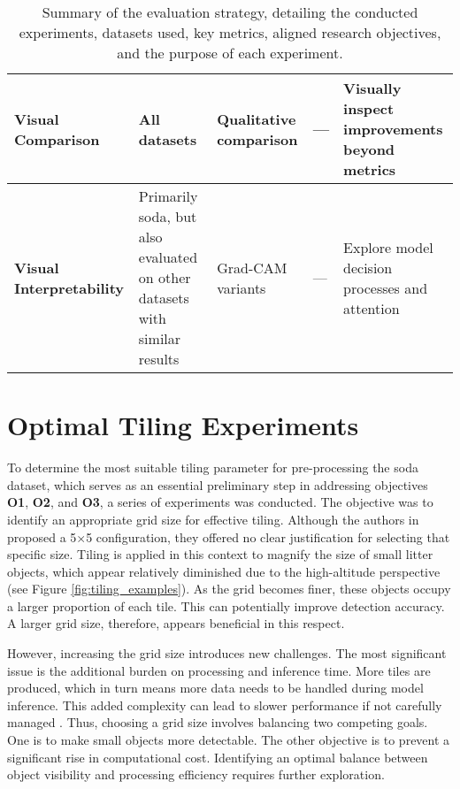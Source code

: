 \begin{table}[htbp]
\begin{adjustbox}{max width=\textwidth}
\begin{tabular}{|l|p{3.5cm}|p{3.5cm}|p{2.5cm}|p{5cm}|}
        \textbf{Visual Comparison} & All datasets & Qualitative comparison & — & Visually inspect improvements beyond metrics \\ \hline
        \textbf{Visual Interpretability} & Primarily \gls{soda}, but also evaluated on other datasets with similar results & Grad-CAM variants & — & Explore model decision processes and attention \\
        \hline
    \end{tabular}
    \end{adjustbox}
    \caption{Summary of the evaluation strategy, detailing the conducted experiments, datasets used, key metrics, aligned research objectives, and the purpose of each experiment.}
    \label{tab:experiment_strategy}
\end{table}


\section{Optimal Tiling Experiments}
\label{sec:5_tiling_exp}

To determine the most suitable tiling parameter for pre-processing the \gls{soda} dataset, which serves as an essential preliminary step in addressing objectives \textbf{O1}, \textbf{O2}, and \textbf{O3}, a series of experiments was conducted. The objective was to identify an appropriate grid size for effective tiling. Although the authors in \cite{detect_litter} proposed a 5$\times$5 configuration, they offered no clear justification for selecting that specific size.
Tiling is applied in this context to magnify the size of small litter objects, which appear relatively diminished due to the high-altitude perspective (see Figure \ref{fig:tiling_examples}). As the grid becomes finer, these objects occupy a larger proportion of each tile. This can potentially improve detection accuracy. A larger grid size, therefore, appears beneficial in this respect.

However, increasing the grid size introduces new challenges. The most significant issue is the additional burden on processing and inference time. More tiles are produced, which in turn means more data needs to be handled during model inference. This added complexity can lead to slower performance if not carefully managed \cite{tiling}.
Thus, choosing a grid size involves balancing two competing goals. One is to make small objects more detectable. The other objective is to prevent a significant rise in computational cost. Identifying an optimal balance between object visibility and processing efficiency requires further exploration.

